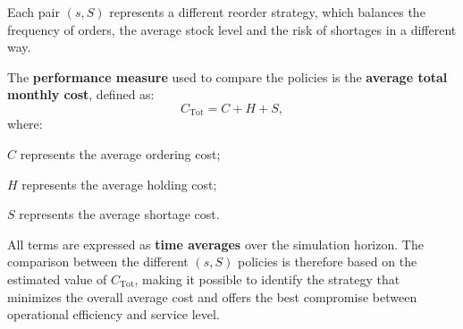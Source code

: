 Each pair $(s,S)$ represents a different reorder strategy, which balances
the frequency of orders, the average stock level and the risk of
shortages in a different way.

The \textbf{performance measure} used to compare the policies is the
\textbf{average total monthly cost}, defined as:
\[
C_{\text{Tot}} = C + H + S,
\]
where:
\begin{compactitemize}
    \item $C$ represents the average ordering cost;
    \item $H$ represents the average holding cost;
    \item $S$ represents the average shortage cost.
\end{compactitemize}

All terms are expressed as \textbf{time averages} over the simulation horizon.
The comparison between the different $(s,S)$ policies is therefore based on the estimated value of
$C_{\text{Tot}}$, making it possible to identify the strategy that minimizes the overall average
cost and offers the best compromise between operational efficiency and service
level.
